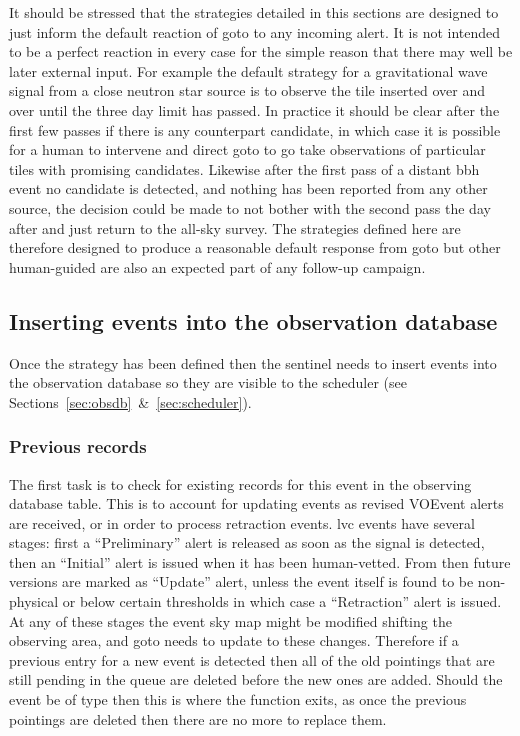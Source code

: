 \begin{colsection}
\begin{colsection}
It should be stressed that the strategies detailed in this sections are designed to just inform the default reaction of \gls{goto} to any incoming alert. It is not intended to be a perfect reaction in every case for the simple reason that there may well be later external input. For example the default strategy for a gravitational wave signal from a close neutron star source is to observe the tile inserted over and over until the three day limit has passed. In practice it should be clear after the first few passes if there is any counterpart candidate, in which case it is possible for a human to intervene and direct \gls{goto} to go take observations of particular tiles with promising candidates. Likewise after the first pass of a distant \gls{bbh} event no candidate is detected, and nothing has been reported from any other source, the decision could be made to not bother with the second pass the day after and just return to the all-sky survey. The strategies defined here are therefore designed to produce a reasonable default response from \gls{goto} but other human-guided are also an expected part of any follow-up campaign.

\end{colsection}


\subsection{Inserting events into the observation database}
\label{sec:db_insert}
\begin{colsection}

Once the strategy has been defined then the sentinel needs to insert events into the observation database so they are visible to the scheduler (see Sections~\ref{sec:obsdb}~\&~\ref{sec:scheduler}).

\subsubsection{Previous records}

The first task is to check for existing records for this event in the observing database  table. This is to account for updating events as revised VOEvent alerts are received, or in order to process retraction events. \gls{lvc} events have several stages: first a ``Preliminary'' alert is released as soon as the signal is detected, then an ``Initial'' alert is issued when it has been human-vetted. From then future versions are marked as ``Update'' alert, unless the event itself is found to be non-physical or below certain thresholds in which case a ``Retraction'' alert is issued. At any of these stages the event sky map might be modified shifting the observing area, and \gls{goto} needs to update to these changes. Therefore if a previous entry for a new event is detected then all of the old pointings that are still pending in the queue are deleted before the new ones are added. Should the event be of type  then this is where the function exits, as once the previous pointings are deleted then there are no more to replace them.


\end{colsection}
\end{colsection}
